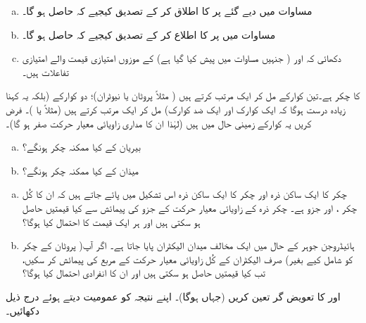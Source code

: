 \begin{enumerate}[a.]
\item
مساوات  میں دیے گئے  پر  کا اطلاق کر کے تصدیق کیجیے
 کہ  حاصل ہو گا۔
\item
مساوات  میں  پر  کا اطلاع کر کے تصدیق کیجیے کہ  حاصل ہو گا۔
\item
دکھائی کہ  اور  ( جنہیں مساوات  میں پیش کیا گیا ہے)  کے موزوں امتیازی قیمت والے امتیازی تفاعلات ہیں۔ 
\end{enumerate}
 کا چکر  ہے۔تین کوارکے مل کر ایک  مرتب کرتے ہیں ( مثلاً پروٹان یا نیوٹران)؛ دو کوارکے (بلکہ یہ کہنا زیادہ درست ہوگا کہ ایک کوارک اور ایک ضد کوارک) مل کر ایک  مرتب کرتے ہیں (مثلاً  یا )۔ فرض کریں یہ کوارکے زمینی حال میں ہیں (لہٰذا ان کا مداری زاویائی معیار حرکت صفر ہو گا)۔ 
\begin{enumerate}[a.]
\item
بیریان کے کیا ممکنہ چکر ہونگے؟ 
\item
میذان کے کیا ممکنہ چکر ہونگے؟ 
\end{enumerate}
\begin{enumerate}[a.]
\item
چکر  کا ایک ساکن ذرہ اور چکر  کا ایک ساکن ذرہ اس تشکیل میں پائے جاتے ہیں کہ ان کا کُل چکر ، اور  جزو  ہے۔ چکر  ذرہ کے زاویائی معیار حرکت کے  جزو کی پیمائش سے کیا قیمتیں حاصل ہو سکتی ہیں اور ہر ایک قیمت کا احتمال کیا ہوگا؟ 
\item
ہائیڈروجن جوہر کے حال  میں ایک مخالف میدان الیکٹران پایا جاتا ہے۔ اگر آپ( پروٹان کے چکر کو شامل کیے بغیر) صرف الیکٹران کے کُل زاویائی معیار حرکت کے مربع کی پیمائش کر سکیں، تب کیا قیمتیں حاصل ہو سکتی ہیں اور ان کا انفرادی احتمال کیا ہوگا؟ 
\end{enumerate}
 اور  کا تعویض گر  تعین کریں (جہاں  ہوگا)۔ اپنے نتیجہ کو عمومیت دیتے ہوئے درج ذیل دکھائیں۔ 
